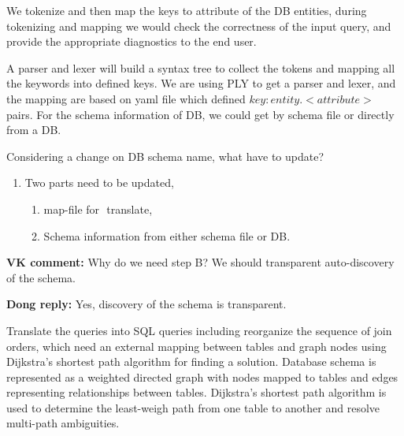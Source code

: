  We tokenize and then map the keys to attribute of the DB entities, during tokenizing and mapping we would check the correctness of the input query, and provide the appropriate diagnostics to the end user.

 A parser and lexer will build a syntax tree to collect the tokens and mapping all the keywords into defined keys. We are using PLY to get a parser and lexer, and the mapping are based on yaml file which defined \(key : entity.<attribute>\) pairs. For the schema information of DB, we could get by schema file or directly from a DB.

Considering a change on DB schema name, what have to update?
\begin{enumerate}
\item Two parts need to be updated,
    \begin{enumerate} 
    \item map-file for \(<key: entity>\) translate,
    \item Schema information from either schema file or DB.
    \end{enumerate}
\end{enumerate}

{\bf VK comment:} Why do we need step B? We should transparent auto-discovery of the schema.

\setlength{\parindent}{0.5in}
{\bf Dong reply:}
Yes, discovery of the schema is transparent.
\setlength{\parindent}{0.25in}

Translate the queries into SQL queries including reorganize the sequence of join orders, which need an external mapping between tables and graph nodes using Dijkstra's shortest path algorithm for finding a solution. Database schema is represented as a weighted directed graph with nodes mapped to tables and edges representing relationships between tables. Dijkstra's shortest path algorithm is used to determine the least-weigh path from one table to another and resolve multi-path ambiguities.

